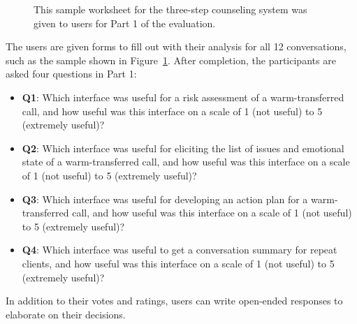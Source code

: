 \begin{figure}[h]
  \vspace{3mm}
  \centering
  \caption{This sample worksheet for the three-step counseling system was given to
  users for Part 1 of the evaluation.}
  \label{worksheet}
\end{figure}

The users are given forms to fill out with their analysis for all 12 conversations,
such as the sample shown in Figure~\ref{worksheet}. After completion, the participants are asked
four questions in Part 1:
\begin{itemize}
  \item \textbf{Q1}: Which interface was useful for a risk assessment of a warm-transferred call,
  and how useful was this interface on a scale of 1 (not useful) to 5 (extremely
  useful)?
  \item \textbf{Q2}: Which interface was useful for eliciting the list of issues and emotional
  state of a warm-transferred call, and how useful was this interface on a scale of
  1 (not useful) to 5 (extremely useful)?
  \item \textbf{Q3}: Which interface was useful for developing an action plan for a
  warm-transferred call, and how useful was this interface on a scale of 1 (not useful) to
  5 (extremely useful)?
  \item \textbf{Q4}: Which interface was useful to get a conversation summary for repeat clients,
  and how useful was this interface on a scale of 1 (not useful) to 5 (extremely
  useful)?
\end{itemize}
In addition to their votes and ratings, users can write open-ended responses to
elaborate on their decisions.

